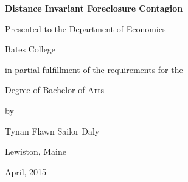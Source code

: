 

\vspace*{4cm} 

\centerline{\LARGE \textbf{Distance Invariant Foreclosure Contagion}}
\bigskip\bigskip

\medskip
\centerline{\Large Presented to the Department of Economics}
\medskip
\centerline{\Large Bates College}
\medskip
\centerline{\Large in partial fulfillment of the requirements for the}
\medskip
\centerline{\Large Degree of Bachelor of Arts}
\medskip
\centerline{\Large by}
\medskip
\centerline{\Large Tynan Flawn Sailor Daly}
\medskip
\centerline{\Large Lewiston, Maine}
\medskip
\centerline{\Large April, 2015}

\newpage

